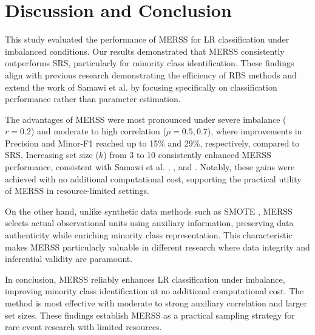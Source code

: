 \documentclass[twoside]{article}
\begin{document}


\section*{Discussion and Conclusion}   

This study evaluated the performance of MERSS for LR classification under imbalanced conditions. Our results demonstrated that MERSS consistently outperforms SRS, particularly for minority class identification. These findings align with previous research demonstrating the efficiency of RBS methods \cite{Santos2017, Yousefi2026} and extend the work of Samawi et al. \cite{Samawi2017, Samawi2020} by focusing specifically on classification performance rather than parameter estimation.

The advantages of MERSS were most pronounced under severe imbalance (\(r = 0.2\)) and moderate to high correlation (\(\rho = 0.5, 0.7\)), where improvements in Precision and Minor-F1 reached up to 15\% and 29\%, respectively, compared to SRS. Increasing set size (\(k\)) from 3 to 10 consistently enhanced MERSS performance, consistent with Samawi et al. \cite{Samawi2017}, \cite{Santos2017}, and \cite{Yousefi2026}. Notably, these gains were achieved with no additional computational cost, supporting the practical utility of MERSS in resource-limited settings.

On the other hand, unlike synthetic data methods such as SMOTE \cite{Elreedy2024}, MERSS selects actual observational units using auxiliary information, preserving data authenticity while enriching minority class representation. This characteristic makes MERSS particularly valuable in different research where data integrity and inferential validity are paramount.

In conclusion, MERSS reliably enhances LR classification under imbalance, improving minority class identification at no additional computational cost. The method is most effective with moderate to strong auxiliary correlation and larger set sizes. These findings establish MERSS as a practical sampling strategy for rare event research with limited resources.
\end{document}
